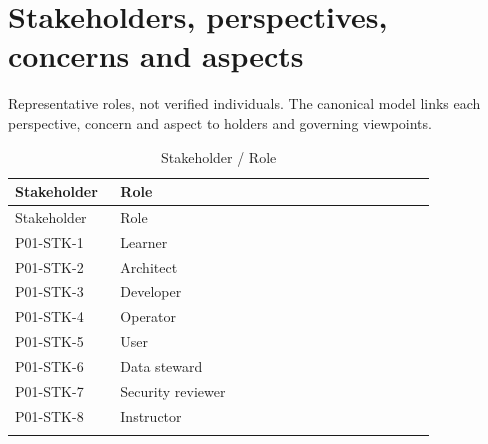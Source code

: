 \documentclass[10pt,letterpaper]{article}
\begin{document}
\section{Stakeholders, perspectives, concerns and aspects}
Representative roles, not verified individuals. The canonical model links each perspective, concern and aspect to holders and governing viewpoints.
\begin{longtable}{@{}>{\raggedright\arraybackslash}p{0.23\linewidth}>{\raggedright\arraybackslash}p{0.69\linewidth}@{}}
\caption{Stakeholder / Role}\\
\toprule Stakeholder & Role\\\midrule\endfirsthead
\toprule Stakeholder & Role\\\midrule\endhead
P01-STK-1 & Learner\\\addlinespace
P01-STK-2 & Architect\\\addlinespace
P01-STK-3 & Developer\\\addlinespace
P01-STK-4 & Operator\\\addlinespace
P01-STK-5 & User\\\addlinespace
P01-STK-6 & Data steward\\\addlinespace
P01-STK-7 & Security reviewer\\\addlinespace
P01-STK-8 & Instructor\\\addlinespace
\bottomrule\end{longtable}
\end{document}
